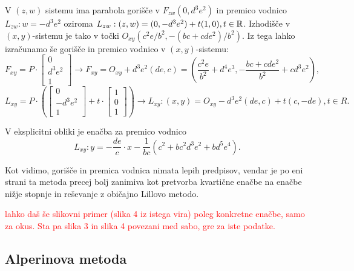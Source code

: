V $(z, w)$ sistemu ima parabola gorišče v $F_{zw}(0, d^3e^2)$ in premico vodnico $L_{zw}: w = - d^3e^2$ oziroma $L_{zw}: (z, w) = (0, -d^3e^2) + t(1, 0), t \in \mathbb R $. Izhodišče v $(x, y)$-sistemu je tako v točki $O_{xy} (c^2e/b^2, -(bc + cde^2)/b^2)$. Iz tega lahko izračunamo še gorišče in premico vodnico v $(x, y)$-sistemu:
$$ F_{xy} = P \cdot \begin{bmatrix} 0\\d^3e^2\\1\end{bmatrix} \longrightarrow F_{xy} = O_{xy} + d^3e^2(de, c) = (\frac{c^2e}{b^2} + d^4e^3, -\frac{bc + cde^2}{b^2} + cd^3e^2),$$
$$ L_{xy} = P \cdot \left( \begin{bmatrix} 0\\-d^3e^2\\1\end{bmatrix} + t \cdot \begin{bmatrix} 1\\0\\1\end{bmatrix} \right) \longrightarrow L_{xy}: (x, y) = O_{xy} - d^3e^2(de, c) + t(c, -de), t \in R.$$

V eksplicitni obliki je enačba za premico vodnico
$$ L_{xy}: y = -\frac{de}{c} \cdot x - \frac{1}{bc} (c^2 + bc^2d^3e^2 + bd^5e^4). $$

Kot vidimo, gorišče in premica vodnica nimata lepih predpisov, vendar je po eni strani ta metoda precej bolj zanimiva kot pretvorba kvartične enačbe na enačbe nižje stopnje in reševanje z običajno Lillovo metodo.

\textcolor{red}{lahko daš še slikovni primer (slika 4 iz istega vira) poleg konkretne enačbe, samo za okus. Sta pa slika 3 in slika 4 povezani med sabo, gre za iste podatke.}

\subsection{Alperinova metoda}

